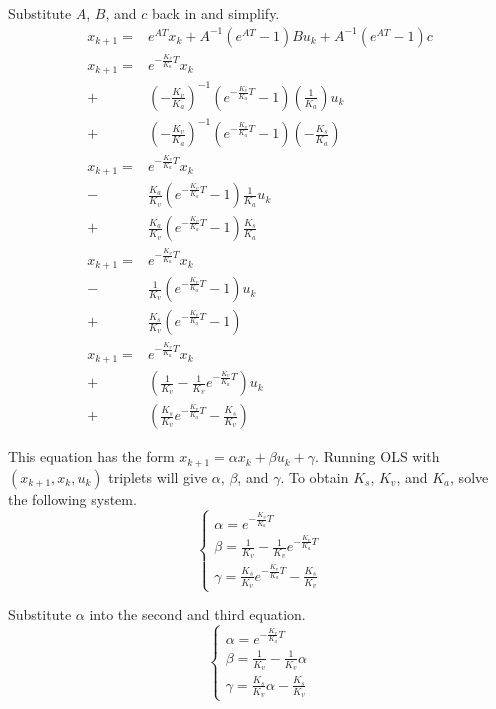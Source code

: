 \documentclass[10pt,conference,compsoc]{IEEEtran}
\begin{document}
Substitute $A$, $B$, and $c$ back in and simplify.
\begin{equation*}
  \begin{aligned}
    x_{k+1} =& e^{AT} x_k + A^{-1} (e^{AT} - 1)Bu_k + A^{-1} (e^{AT} - 1)c \\
    x_{k+1} =& e^{-\frac{K_v}{K_a} T} x_k \\
      +& \left(-\frac{K_v}{K_a}\right)^{-1}
        \left(e^{-\frac{K_v}{K_a} T} - 1\right)
        \left(\frac{1}{K_a}\right) u_k \\
      +& \left(-\frac{K_v}{K_a}\right)^{-1}
        \left(e^{-\frac{K_v}{K_a} T} - 1\right)
        \left(-\frac{K_s}{K_a}\right) \\
    x_{k+1} =& e^{-\frac{K_v}{K_a} T} x_k \\
      -& \frac{K_a}{K_v}
        \left(e^{-\frac{K_v}{K_a} T} - 1\right)
        \frac{1}{K_a} u_k \\
      +& \frac{K_a}{K_v}
        \left(e^{-\frac{K_v}{K_a} T} - 1\right)
        \frac{K_s}{K_a} \\
    x_{k+1} =& e^{-\frac{K_v}{K_a} T} x_k \\
      -& \frac{1}{K_v}
        \left(e^{-\frac{K_v}{K_a} T} - 1\right) u_k \\
      +& \frac{K_s}{K_v}
        \left(e^{-\frac{K_v}{K_a} T} - 1\right) \\
    x_{k+1} =& e^{-\frac{K_v}{K_a} T} x_k \\
      +& \left(\frac{1}{K_v} - \frac{1}{K_v}e^{-\frac{K_v}{K_a} T}\right) u_k \\
      +& \left(\frac{K_s}{K_v}e^{-\frac{K_v}{K_a} T} - \frac{K_s}{K_v}\right)
  \end{aligned}
\end{equation*}

This equation has the form $x_{k+1} = \alpha x_k + \beta u_k + \gamma$. Running
OLS with $(x_{k+1}, x_k, u_k)$ triplets will give $\alpha$, $\beta$, and
$\gamma$. To obtain $K_s$, $K_v$, and $K_a$, solve the following system.
\begin{equation*}
  \begin{cases}
    \alpha = e^{-\frac{K_v}{K_a} T} \\
    \beta = \frac{1}{K_v} - \frac{1}{K_v}e^{-\frac{K_v}{K_a} T} \\
    \gamma = \frac{K_s}{K_v}e^{-\frac{K_v}{K_a} T} - \frac{K_s}{K_v}
  \end{cases}
\end{equation*}

Substitute $\alpha$ into the second and third equation.
\begin{equation}
  \begin{cases}
    \alpha = e^{-\frac{K_v}{K_a} T} \\
    \beta = \frac{1}{K_v} - \frac{1}{K_v}\alpha \\
    \gamma = \frac{K_s}{K_v}\alpha - \frac{K_s}{K_v}
  \end{cases} \label{eq:system}
\end{equation}
\end{document}
